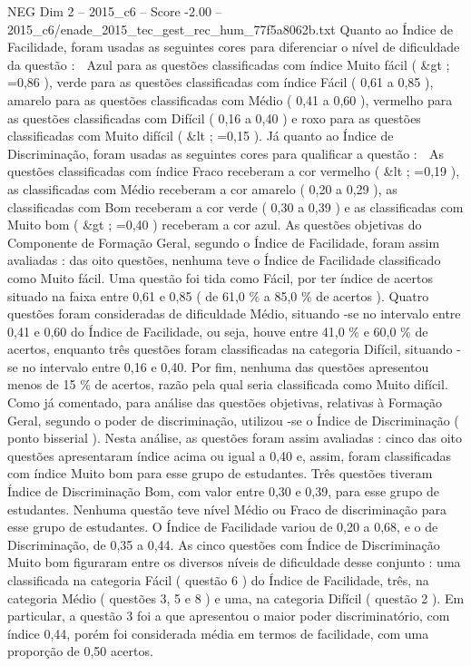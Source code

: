 \begin{textsample}{NEG Dim 2 – 2015\_c6 – Score -2.00 – 2015\_c6/enade\_2015\_tec\_gest\_rec\_hum\_77f5a8062b.txt}
Quanto ao Índice de Facilidade, foram usadas as seguintes cores para diferenciar o nível de dificuldade da questão :  Azul para as questões classificadas com índice Muito fácil ( \&gt ; =0,86 ), verde para as questões classificadas com índice Fácil ( 0,61 a 0,85 ), amarelo para as questões classificadas com Médio ( 0,41 a 0,60 ), vermelho para as questões classificadas com Difícil ( 0,16 a 0,40 ) e roxo para as questões classificadas com Muito difícil ( \&lt ; =0,15 ).
Já quanto ao Índice de Discriminação, foram usadas as seguintes cores para qualificar a questão :  As questões classificadas com índice Fraco receberam a cor vermelho ( \&lt ; =0,19 ), as classificadas com Médio receberam a cor amarelo ( 0,20 a 0,29 ), as classificadas com Bom receberam a cor verde ( 0,30 a 0,39 ) e as classificadas com Muito bom ( \&gt ; =0,40 ) receberam a cor azul.
As questões objetivas do Componente de Formação Geral, segundo o Índice de Facilidade, foram assim avaliadas : das oito questões, nenhuma teve o Índice de Facilidade classificado como Muito fácil.
Uma questão foi tida como Fácil, por ter índice de acertos situado na faixa entre 0,61 e 0,85 ( de 61,0 \% a 85,0 \% de acertos ).
Quatro questões foram consideradas de dificuldade Médio, situando -se no intervalo entre 0,41 e 0,60 do Índice de Facilidade, ou seja, houve entre 41,0 \% e 60,0 \% de acertos, enquanto três questões foram classificadas na categoria Difícil, situando -se no intervalo entre 0,16 e 0,40.
Por fim, nenhuma das questões apresentou menos de 15 \% de acertos, razão pela qual seria classificada como Muito difícil.
Como já comentado, para análise das questões objetivas, relativas à Formação Geral, segundo o poder de discriminação, utilizou -se o Índice de Discriminação ( ponto bisserial ).
Nesta análise, as questões foram assim avaliadas : cinco das oito questões apresentaram índice acima ou igual a 0,40 e, assim, foram classificadas com índice Muito bom para esse grupo de estudantes.
Três questões tiveram Índice de Discriminação Bom, com valor entre 0,30 e 0,39, para esse grupo de estudantes.
Nenhuma questão teve nível Médio ou Fraco de discriminação para esse grupo de estudantes.
O Índice de Facilidade variou de 0,20 a 0,68, e o de Discriminação, de 0,35 a 0,44.
As cinco questões com Índice de Discriminação Muito bom figuraram entre os diversos níveis de dificuldade desse conjunto : uma classificada na categoria Fácil ( questão 6 ) do Índice de Facilidade, três, na categoria Médio ( questões 3, 5 e 8 ) e uma, na categoria Difícil ( questão 2 ).
Em particular, a questão 3 foi a que apresentou o maior poder discriminatório, com índice 0,44, porém foi considerada média em termos de facilidade, com uma proporção de 0,50 acertos.

\end{textsample}
